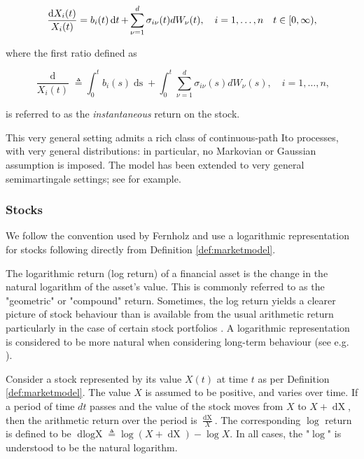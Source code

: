 \documentclass[british]{amsart} \usepackage{lmodern}
\numberwithin{equation}{section} \numberwithin{figure}{section}
\theoremstyle{plain} \newtheorem{thm}{\protect\theoremname}[section]
\theoremstyle{definition} \newtheorem{defn}[thm]{\protect\definitionname}
\theoremstyle{plain} \newtheorem{assumption}[thm]{\protect\assumptionname}
\theoremstyle{plain} \newtheorem{lem}[thm]{\protect\lemmaname}
\theoremstyle{plain} \newtheorem{prop}[thm]{\protect\propositionname}
\theoremstyle{remark} \newtheorem{rem}[thm]{\protect\remarkname}
\theoremstyle{plain} \newtheorem{cor}[thm]{\protect\corollaryname}
\renewcommand{\d}[1]{\mathop{\mathrm{d}{#1}}}
\newcommand{\defeq}{\mathop{\triangleq}} \newcommand{\almostsurely}{\text{a.s.}}
\newcommand{\rangei}{i=1,\dots,n} \newcommand{\measure}{\mathbb{P}}
\begin{document}
\begin{equation}
  \label{eq:stockpriceprocessdiff}
    \frac{\d{X_{i}(t)}}{X_{i}(t)} = b_{i}(t)\d{t} + \sum_{\nu=1}^{d} \sigma_{i\nu}(t) dW_{\nu}(t),
  \quad \rangei
  \quad \ranget,
\end{equation}

where the first ratio defined as

\begin{equation*}
  \frac{\d{X_{i}(t)}}{X_{i}(t)} \defeq 
  \int_{0}^{t} b_{i}(s)\d{s} + 
  \int_{0}^{t} \sum_{\nu=1}^{d} \sigma_{i\nu}(s) dW_{\nu}(s),
  \quad \rangei,
\end{equation*}

is referred to as the \textit{instantaneous} return on the stock.

This very general setting admits a rich class of continuous-path Ito processes,
with very general distributions: in particular, no Markovian or Gaussian
assumption is imposed. The model has been extended to very general
semimartingale settings; see \cite{kardaras2003} for example.

\subsubsection{Stocks}

We follow the convention used by Fernholz and use a logarithmic representation
for stocks following directly from Definition \ref{def:marketmodel}.

The logarithmic return (log return) of a financial asset is the change in the
natural logarithm of the asset's value. This is commonly referred to as the
"geometric" or "compound" return. Sometimes, the log return yields a clearer
picture of stock behaviour than is available from the usual arithmetic return
particularly in the case of certain stock portfolios
\cite{fernholz2007statistics}. A logarithmic representation is considered to be
more natural when considering long-term behaviour (see e.g.
\cite{fernholz1982}).

Consider a stock represented by its value $X(t)$ at time $t$ as per Definition
\ref{def:marketmodel}. The value $X$ is assumed to be positive, and varies over
time. If a period of time $dt$ passes and the value of the stock moves from $X$
to $X + \d{X}$, then the arithmetic return over the period is $\frac{\d{X}}{X}$.
The corresponding $\log$ return is defined to be $\d{\log{X}} \defeq \log{(X +
\d{X})} - \log{X}$. In all cases, the "$\log$" is understood to be the natural logarithm.
\end{document}
